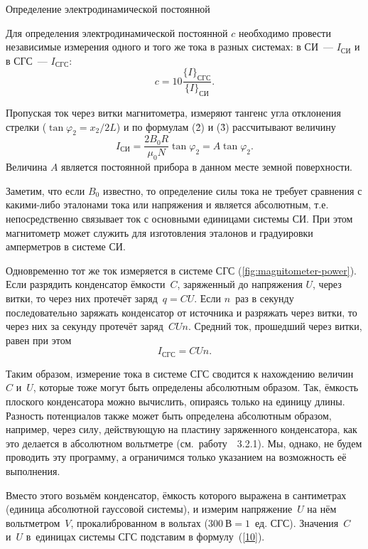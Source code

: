 {	
\par{Определение электродинамической постоянной}

Для определения электродинамической постоянной $c$ необходимо провести независимые измерения одного и того же тока в
разных системах: в СИ~--- $I_{СИ}$ и в СГС~--- $I_{СГС}$:
\begin{equation}
	c=10\frac{\{I\}_{СГС}}{\{I\}_{СИ}}.
\end{equation}

Пропуская ток через витки магнитометра, измеряют тангенс угла отклонения стрелки ($\tan\varphi_2=x_2/2L$) и по формулам
(\r2) и (\r3) рассчитывают величину
\begin{equation}
	I_{СИ}=\frac{2B_0R}{\mu_0 N}\tan\varphi_2=A\tan\varphi_2.
\end{equation}
Величина $A$ является постоянной прибора в данном месте земной поверхности.

Заметим, что если $B_0$ известно, то определение силы тока не требует сравнения с какими-либо эталонами тока или
напряжения и является абсолютным, т.е. непосредственно связывает ток с основными единицами системы СИ. При этом
магнитометр может служить для изготовления эталонов и градуировки амперметров в системе СИ.


Одновременно тот же ток измеряется в системе СГС (\ref{fig:magnitometer-power}). Если разрядить конденсатор ёмкости~$C$, заряженный до напряжения
$U$, через витки, то через них протечёт заряд~$q=CU$. Если $n$~раз в секунду последовательно заряжать конденсатор от
источника и разряжать через витки, то через них за секунду протечёт заряд~$CUn$. Средний ток, прошедший через витки,
равен при этом
\begin{equation}
	I_{СГС}=CUn.
\end{equation}

Таким образом, измерение тока в системе СГС сводится к нахождению величин~$C$ и~$U$, которые тоже могут быть определены
абсолютным образом. Так, ёмкость плоского конденсатора можно вычислить, опираясь только на единицу длины. Разность
потенциалов также может быть определена абсолютным образом, например, через силу, действующую на пластину заряженного
конденсатора, как это делается в абсолютном вольтметре (см.~работу~\textnumero~3.2.1). Мы, однако, не будем проводить эту
программу, а ограничимся только указанием на возможность её выполнения.

Вместо этого возьмём конденсатор, ёмкость которого выражена в сантиметрах (единица абсолютной гауссовой системы), и
измерим напряжение~$U$ на нём вольтметром~$V$, прокалиброванном в вольтах ($300~В = 1$~ед. СГС). Значения~$C$ и~$U$
в~единицах системы СГС подставим в формулу~(\eqref{10}).

}
